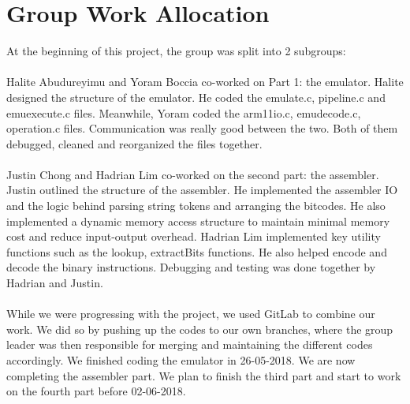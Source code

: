 \documentclass[a4paper]{article}
\begin{document}
\newpage

\section{Group Work Allocation}
At the beginning of this project, the group was split into 2 subgroups:\\ \\
Halite Abudureyimu and Yoram Boccia co-worked on Part 1: the emulator. Halite designed the structure of the emulator. He coded the emulate.c, pipeline.c and emuexecute.c files. Meanwhile, Yoram coded the arm11io.c, emudecode.c, operation.c files. Communication was really good between the two. Both of them debugged, cleaned and reorganized the files together.
\\\\
Justin Chong and Hadrian Lim co-worked on the second part: the assembler. Justin outlined the structure of the assembler. He implemented the assembler IO and the logic behind parsing string tokens and arranging the bitcodes. He also implemented a dynamic memory access structure to maintain minimal memory cost and reduce input-output overhead. Hadrian Lim implemented key utility functions such as the lookup, extractBits functions. He also helped encode and decode the binary instructions. Debugging and testing was done together by Hadrian and Justin.
\\\\
While we were progressing with the project, we used GitLab to combine our work. We did so by pushing up the codes to our own branches, where the group leader was then responsible for merging and maintaining the different codes accordingly. We finished coding the emulator in 26-05-2018. We are now completing the assembler part. We plan to finish the third part and start to work on the fourth part before 02-06-2018.
\end{document}
